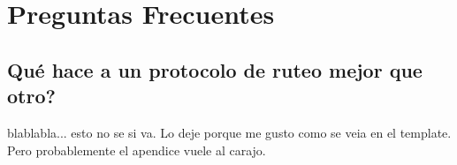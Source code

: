 
\chapter{Preguntas Frecuentes} %

\label{AppendixA} %

\section{Qué hace a un protocolo de ruteo mejor que otro? }

blablabla... esto no se si va. Lo deje porque me gusto como se veia en el template. Pero probablemente el apendice vuele al carajo.








